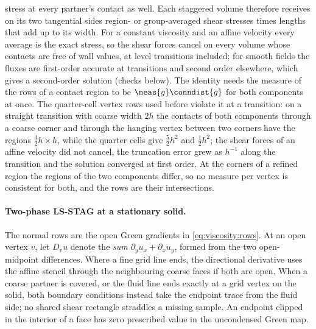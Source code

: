 stress at every partner's contact as well. Each staggered volume therefore
receives on its two tangential sides region- or group-averaged shear stresses
times lengths that add up to its width. For a constant viscosity and an
affine velocity every average is the exact stress, so the shear forces cancel
on every volume whose contacts are free of wall values, at level transitions
included; for
smooth fields the fluxes are first-order accurate at transitions and second
order elsewhere, which gives a second-order solution (checks below). The
identity needs the measure of the rows of a contact region to be
$\meas{g}\conndist{g}$ for both components at once. The quarter-cell vertex
rows used before  violate it at a transition: on a straight
transition with coarse width $2h$ the contacts of both components through a
coarse corner and through the hanging vertex between two corners have the
regions $\tfrac32h\times h$, while the quarter cells give
$\tfrac52h^2$ and $\tfrac12h^2$; the shear forces of an affine velocity did
not cancel, the truncation error grew as $h^{-1}$ along the transition and
the solution converged at first order. At the corners of a refined region
the regions of the two components differ, so no measure per vertex is
consistent for both, and the rows are their intersections.

\paragraph{Two-phase LS-STAG at a stationary solid.}
The normal rows are the open Green gradients in \cref{eq:viscosity:rows}.
At an open vertex $v$, let $D_v u$ denote the \emph{sum}
$\partial_y u_x+\partial_x u_y$, formed from the two open-midpoint
differences. Where a fine grid line ends, the directional derivative uses
the affine stencil through the neighbouring coarse faces if both are open.
When a coarse partner is covered, or the fluid line ends exactly at a grid
vertex on the solid, both boundary conditions instead take the endpoint
trace from the fluid side; no shared shear rectangle straddles a missing
sample. An endpoint clipped in the interior of a face has zero prescribed
value in the uncondensed Green map.

